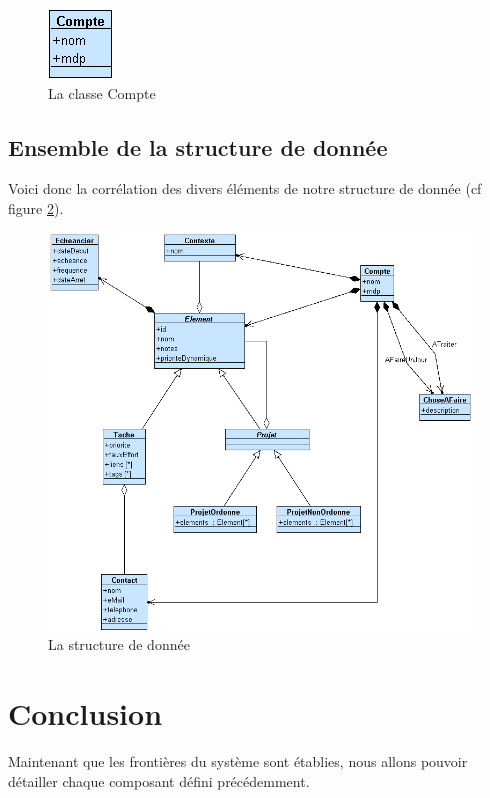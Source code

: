 \begin{figure}[htbp]
	\centering
		\includegraphics[scale=1]{images/L3/structureDonnee/compte.png}
	\caption{La classe Compte}
	\label{fig:compte}
\end{figure}

\subsection{Ensemble de la structure de donnée}

Voici donc la corrélation des divers éléments de notre structure de donnée (cf figure \ref{fig:structure}).

\begin{figure}[htbp]
	\centering
		\includegraphics[width=15cm]{images/L3/structureDonnee/comptes.png}
	\caption{La structure de donnée}
	\label{fig:structure}
\end{figure}

\section{Conclusion}

Maintenant que les frontières du système sont établies, nous allons pouvoir détailler chaque composant défini précédemment.
